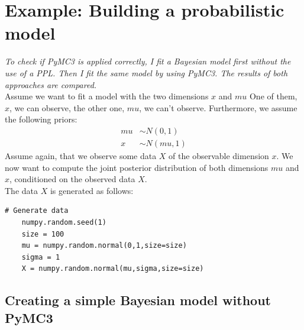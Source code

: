 \documentclass{article}
\begin{document}
\section{Example: Building a probabilistic model}
\label{sec:Comparison}
\textit{To check if PyMC3 is applied correctly, I fit a Bayesian model first without the use of a PPL. Then I fit the same model by using PyMC3. The results of both approaches are compared.}
\\
Assume we want to fit a model with the two dimensions $x$ and $mu$ One of them, $x$, we can observe, the other one, $mu$, we can't observe. Furthermore, we assume the following priors:
\begin{equation}
\label{eq:data_generating_manual_example}
\begin{split}
mu &\sim N(0,1)\\
x &\sim N(mu,1)
\end{split}
\end{equation}
Assume again, that we observe some data $X$ of the observable dimension $x$.
We now want to compute the joint posterior distribution of both dimensions $mu$ and $x$, conditioned on the observed data $X$.
\\
The data $X$ is generated as follows:\\
\begin{lstlisting}[caption = {Data generation for the example model}, label={list:groundtruth_example_code_data_generation}, captionpos=b]
	# Generate data
	numpy.random.seed(1)
	size = 100
	mu = numpy.random.normal(0,1,size=size)
	sigma = 1
	X = numpy.random.normal(mu,sigma,size=size)
\end{lstlisting}

\subsection{Creating a simple Bayesian model without PyMC3}
\label{subsec: Complete example of a simple Bayesian model}
\end{document}
